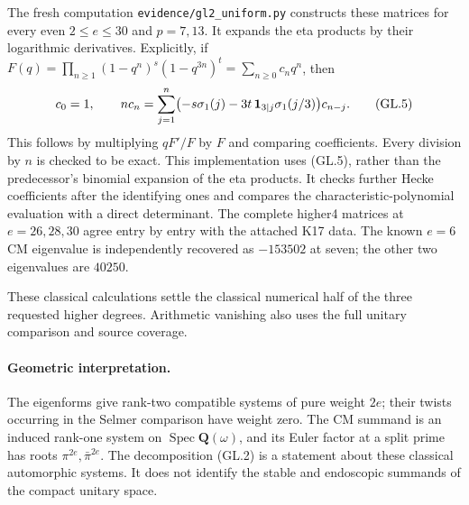 The fresh computation \texttt{evidence/gl2\_uniform.py}
constructs these matrices for every even $2\leq e\leq30$
and $p=7,13$. It expands the eta products by their logarithmic
derivatives. Explicitly, if
$F(q)=\prod_{n\geq1}(1-q^n)^s(1-q^{3n})^t
=\sum_{n\geq0}c_nq^n$, then
\[
 c_0=1,\qquad
 n c_n=\sum_{j=1}^n
   \bigl(-s\sigma_1(j)-3t\,{\bf1}_{3\mid j}\sigma_1(j/3)\bigr)c_{n-j}.
 \tag{GL.5}
\]
This follows by multiplying $qF'/F$ by $F$ and comparing
coefficients. Every division by $n$ is checked to be exact.
This implementation uses (GL.5), rather than the predecessor's
binomial expansion of the eta products.
It checks further Hecke coefficients after the identifying
ones and compares the characteristic-polynomial evaluation
with a direct determinant. The complete higher4 matrices at
$e=26,28,30$ agree entry by entry with the attached K17 data.
The known $e=6$ CM eigenvalue is independently recovered as
$-153502$ at seven; the other two eigenvalues are $40250$.

These classical calculations settle the classical numerical half
of the three requested higher degrees. Arithmetic vanishing
also uses the full unitary comparison and source coverage.

\paragraph{Geometric interpretation.}
The eigenforms give rank-two compatible systems of pure weight
$2e$; their twists occurring in the Selmer comparison have
weight zero. The CM summand is an induced rank-one system on
$\operatorname{Spec}\mathbf Q(\omega)$, and its Euler factor
at a split prime has roots $\pi^{2e},\bar\pi^{2e}$.
The decomposition (GL.2) is a statement about these classical
automorphic systems. It does not identify the stable and
endoscopic summands of the compact unitary space.
